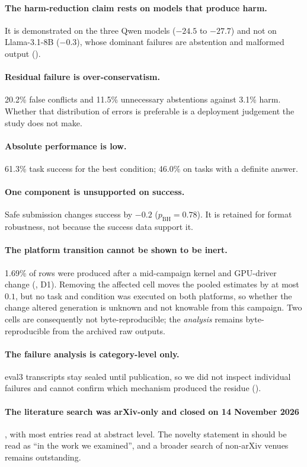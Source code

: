 \paragraph{The harm-reduction claim rests on models that produce harm.} It is demonstrated on the three Qwen
models ($-24.5$ to $-27.7$\pp) and not on Llama-3.1-8B ($-0.3$\pp), whose dominant failures are abstention and
malformed output ().

\paragraph{Residual failure is over-conservatism.} 20.2\% false conflicts and 11.5\% unnecessary abstentions
against 3.1\% harm. Whether that distribution of errors is preferable is a deployment judgement the study does not
make.

\paragraph{Absolute performance is low.} 61.3\% task success for the best condition; 46.0\% on tasks with a
definite answer.

\paragraph{One component is unsupported on success.} Safe submission changes success by $-0.2$\pp{}
($p_{\text{BH}}=0.78$). It is retained for format robustness, not because the success data support it.

\paragraph{The platform transition cannot be shown to be inert.} 1.69\% of rows were produced after a mid-campaign
kernel and GPU-driver change (, D1). Removing the affected cell moves the pooled estimates by
at most $0.1$\pp, but no task and condition was executed on both platforms, so whether the change altered
generation is unknown and not knowable from this campaign. Two cells are consequently not byte-reproducible; the
\emph{analysis} remains byte-reproducible from the archived raw outputs.

\paragraph{The failure analysis is category-level only.} eval3 transcripts stay sealed until publication, so we did
not inspect individual failures and cannot confirm which mechanism produced the residue
().

\paragraph{The literature search was arXiv-only and closed on 14 November 2026}, with most entries read at
abstract level. The novelty statement in  should be read as ``in the work we examined'', and a
broader search of non-arXiv venues remains outstanding.
